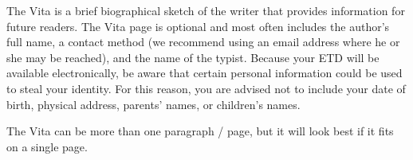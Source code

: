 The Vita is a brief biographical sketch of the writer that provides information for future readers.
The Vita page is optional and most often includes the author's full name, a contact method (we recommend using an email address where he or she may be reached), and the name of the typist.
Because your ETD will be available electronically, be aware that certain personal information could be used to steal your identity.
For this reason, you are advised not to include your date of birth, physical address, parents' names, or children's names.

The Vita can be more than one paragraph / page, but it will look best if it fits on a single page.
